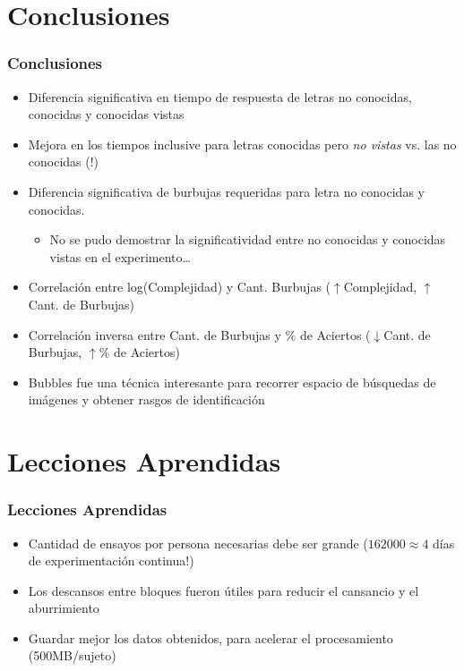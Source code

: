 \documentclass[10pt]{beamer}
\begin{document}
  \section{Conclusiones}
	\begin{frame}
	\frametitle{Conclusiones}
	    \begin{itemize}
		\item Diferencia significativa en tiempo de respuesta de letras no conocidas, conocidas y conocidas vistas
		\item Mejora en los tiempos inclusive para letras conocidas pero \emph{no vistas} vs. las no conocidas \alert{(!)}
		\item Diferencia significativa de burbujas requeridas para letra no conocidas y conocidas.
		\begin{itemize}
		    \item No se pudo demostrar la significatividad entre no conocidas y conocidas vistas en el experimento\ldots
		\end{itemize}
		\item Correlación entre log(Complejidad) y Cant. Burbujas (\alert{\bf$\uparrow$}Complejidad, \alert{\bf$\uparrow$}Cant. de Burbujas)
		\item Correlación inversa entre Cant. de Burbujas y \% de Aciertos (\alert{\bf$\downarrow$}Cant. de Burbujas, \alert{\bf$\uparrow$}\% de Aciertos)
		\item Bubbles fue una técnica interesante para recorrer espacio de búsquedas de imágenes y obtener rasgos de identificación
	    \end{itemize}
	\end{frame}

  \section{Lecciones Aprendidas}
	\begin{frame}
	\frametitle{Lecciones Aprendidas}
	    \begin{itemize}
	    \item Cantidad de ensayos por persona necesarias debe ser grande ($162000 \approx 4$ días de experimentación continua\alert{!})
	    \item Los descansos entre bloques fueron útiles para reducir el cansancio y el aburrimiento
	    \item Guardar mejor los datos obtenidos, para acelerar el procesamiento (500MB/sujeto)
	    \end{itemize}
	\end{frame}
\end{document}

